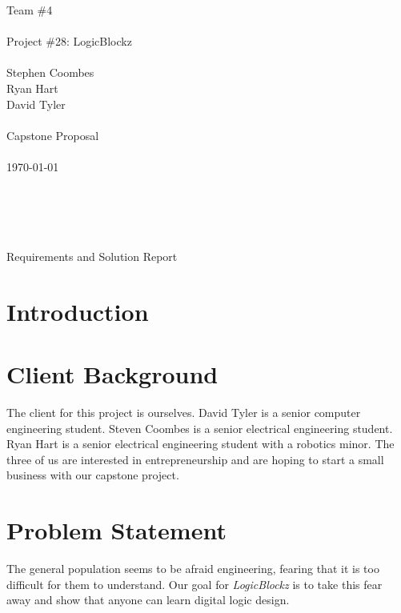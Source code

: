 \documentclass[12pt]{report}
\begin{document}

\noindent Team \#4 \\  \\
Project \#28: LogicBlockz \\ \\
Stephen Coombes \\
Ryan Hart \\
David Tyler \\ \\
Capstone Proposal \\ \\
\today \\ \\ \\ \\ \\
\centerline{Requirements and Solution Report}
\newpage


\section*{Introduction}




\section*{Client Background}

The client for this project is ourselves. David Tyler is a senior computer engineering student. Steven Coombes is a senior electrical engineering student. Ryan Hart is a senior electrical engineering student with a robotics minor. The three of us are interested in entrepreneurship and are hoping to start a small business with our capstone project. 

\section*{Problem Statement}

The general population seems to be afraid engineering, fearing that it is too difficult for them to understand. Our goal for \textit{LogicBlockz} is to take this fear away and show that anyone can learn digital logic design. 
\end{document}

